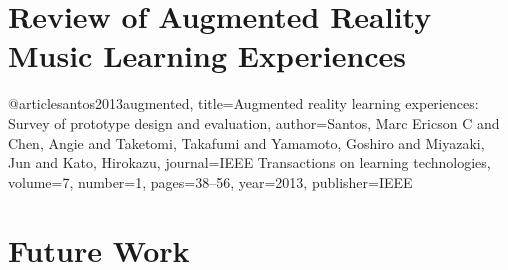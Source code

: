 \documentclass{article}
\begin{document}
\section{Review of Augmented Reality Music Learning Experiences}

@article{santos2013augmented,
  title={Augmented reality learning experiences: Survey of prototype design and evaluation},
  author={Santos, Marc Ericson C and Chen, Angie and Taketomi, Takafumi and Yamamoto, Goshiro and Miyazaki, Jun and Kato, Hirokazu},
  journal={IEEE Transactions on learning technologies},
  volume={7},
  number={1},
  pages={38--56},
  year={2013},
  publisher={IEEE}
}

\section{Future Work}














\end{document}
